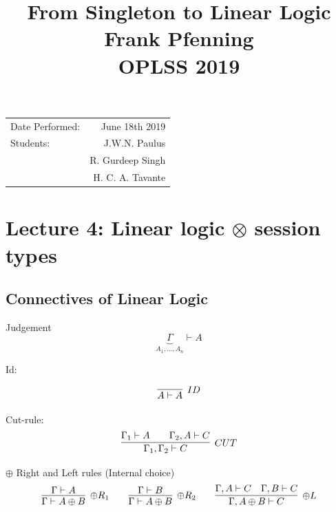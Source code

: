 \documentclass{article}
\title{From Singleton to Linear Logic \\ Frank Pfenning \\ OPLSS 2019} %
\begin{document}
	
	\maketitle %
	
	\begin{center}
		\begin{tabular}{l r}
			Date Performed: & June 18th 2019 \\ %
			Students: & J.W.N. Paulus  \\
			& R. Gurdeep Singh \\ %
			& H. C. A. Tavante
		\end{tabular}
	\end{center}
	
	
	\setcounter{section}{3} %
	\section{Lecture 4: Linear logic \(\otimes\) session types}
	\subsection{Connectives of Linear Logic}

	Judgement 
	\[
	\underbrace{\Gamma}_{A_1,...,A_n} \vdash A
	\]

	Id:

	\[
	\infer[\scriptsize{ID}]
	{A \vdash A}
	{}
	\]

	Cut-rule:
	\[
	\infer[\scriptsize{CUT}]
	{\Gamma_{1}, \Gamma_{2} \vdash C}
	{\Gamma_{1} \vdash A \hspace{2em} \Gamma_{2}, A \vdash C}
	\]

  $\oplus$ Right and Left rules (Internal choice)
	\[
	\infer[\oplus\scriptsize{R_1}]
	{\Gamma \vdash A \oplus B}{\Gamma \vdash A}
	\qquad
	\infer[\oplus\scriptsize{R_2}]
	{\Gamma \vdash A \oplus B}{\Gamma \vdash B}
	\qquad
	\infer[\oplus\scriptsize{L}]
	{\Gamma, A \oplus B \vdash C}{\Gamma, A \vdash C \hspace{1em} \Gamma, B \vdash C}
	\]
\end{document}
